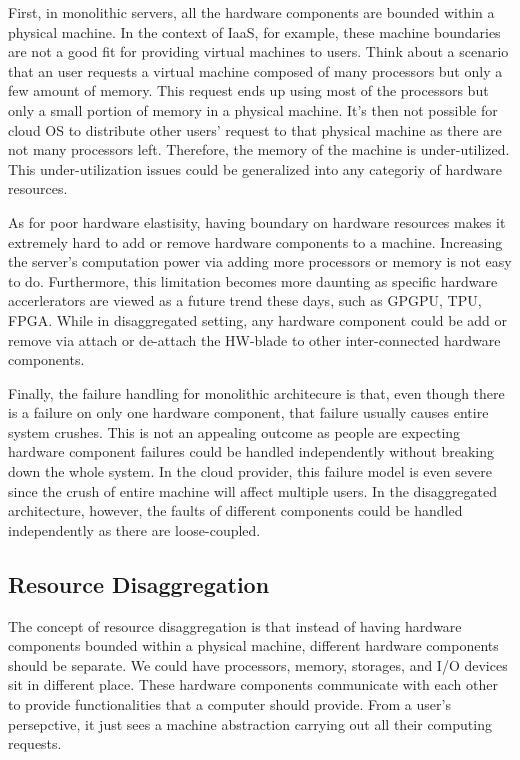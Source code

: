 \documentclass[twocolumn]{article}
\begin{document}
First, in monolithic servers, all the hardware components are bounded within a physical machine. In the context of IaaS, for example, these machine boundaries are not a good fit for providing virtual machines to users. Think about a scenario that an user requests a virtual machine composed of many processors but only a few amount of memory. This request ends up using most of the processors but only a small portion of memory in a physical machine. It's then not possible for cloud OS to distribute other users' request to that physical machine as there are not many processors left. Therefore, the memory of the machine is under-utilized. This under-utilization issues could be generalized into any categoriy of hardware resources.

As for poor hardware elastisity, having boundary on hardware resources makes it extremely hard to add or remove hardware components to a machine. Increasing the server's computation power via adding more processors or memory is not easy to do. Furthermore, this limitation becomes more daunting as specific hardware accerlerators are viewed as a future trend these days\cite{Heterogeous_computing}, such as GPGPU\cite{Google_GPGPU}, TPU\cite{TPU}, FPGA\cite{Datacenter_FPGA}. While in disaggregated setting, any hardware component could be add or remove via attach or de-attach the HW-blade to other inter-connected hardware components.

Finally, the failure handling for monolithic architecure is that, even though there is a failure on only one hardware component, that failure usually causes entire system crushes. This is not an appealing outcome as people are expecting hardware component failures could be handled independently without breaking down the whole system. In the cloud provider, this failure model is even severe since the crush of entire machine will affect multiple users. In the disaggregated architecture, however, the faults of different components could be handled independently as there are loose-coupled.

\subsection{Resource Disaggregation}

The concept of resource disaggregation is that instead of having hardware components bounded within a physical machine, different hardware components should be separate. We could have processors, memory, storages, and I/O devices sit in different place. These hardware components communicate with each other to provide functionalities that a computer should provide. From a user's persepctive, it just sees a machine abstraction carrying out all their computing requests. 
\end{document}

